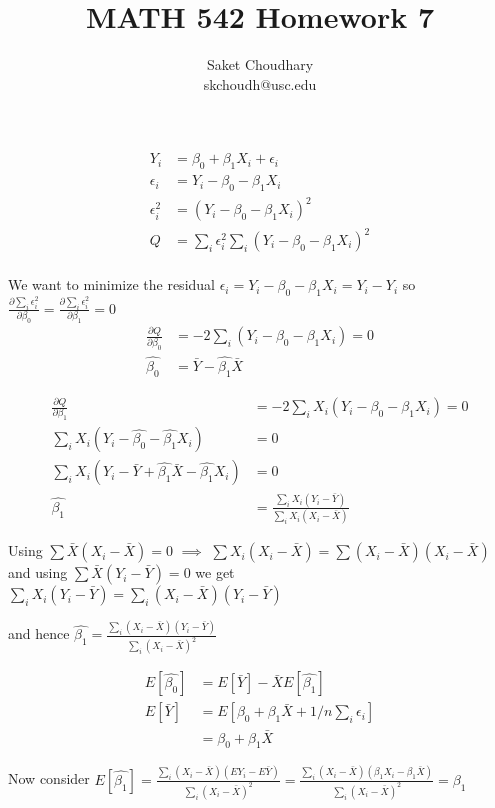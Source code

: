 \documentclass[a4paper]{article}
\title{MATH 542 Homework 7}
\author{Saket Choudhary\\skchoudh@usc.edu}
\begin{document}
\maketitle 

\begin{align*}
Y_i &= \beta_0+\beta_1X_i+\epsilon_i\\
\epsilon_i&=Y_i - \beta_0-\beta_1X_i\\
\epsilon_i^2&=(Y_i - \beta_0-\beta_1X_i)^2\\
Q&=\sum_i\epsilon_i^2\sum_i(Y_i - \beta_0-\beta_1X_i)^2\\
\end{align*}

We want to minimize the residual $\epsilon_i=Y_i - \beta_0-\beta_1X_i = Y_i-\hat{Y_i}$ so $\frac{\partial \sum_i\epsilon_i^2}{\partial \beta_0}=\frac{\partial \sum_i\epsilon_i^2}{\partial \beta_1}=0$
\begin{align*}
\frac{\partial Q}{\partial \beta_0} &= -2\sum_i(Y_i - \beta_0-\beta_1X_i)=0\\
\hat{\beta_0} &= \bar{Y}-\hat{\beta_1}\bar{X}
\end{align*}

\begin{align*}
\frac{\partial Q}{\partial \beta_1} &= -2\sum_iX_i(Y_i - \beta_0-\beta_1X_i)=0\\
\sum_iX_i(Y_i - \hat{\beta_0}-\hat{\beta_1}X_i)&=0\\
\sum_iX_i(Y_i - \bar{Y}+\hat{\beta_1}\bar{X}-\hat{\beta_1}X_i)&=0\\
\hat{\beta_1} &= \frac{\sum_iX_i(Y_i-\bar{Y})}{\sum_iX_i(X_i-\bar{X})}
\end{align*}

Using $\sum \bar{X}(X_i-\bar{X}) =0$ $\implies$ $\sum X_i(X_i-\bar{X})=\sum (X_i-\bar{X})(X_i-\bar{X})$
and using $\sum \bar{X}(Y_i-\bar{Y}) =0$ we get $\sum_iX_i(Y_i-\bar{Y}) = \sum_i(X_i-\bar{X})(Y_i-\bar{Y})$

and hence $\hat{\beta_1} = \frac{\sum_i(X_i-\bar{X})(Y_i-\bar{Y})}{\sum_i(X_i-\bar{X})^2}$

\begin{align*}
E[\hat{\beta_0}] &= E[\bar{Y}]-\bar{X}E[\hat{\beta_1}]\\
E[\bar{Y}] &= E[\beta_0+\beta_1\bar{X}+1/n\sum_i \epsilon_i] \\
&=\beta_0+\beta_1\bar{X}
\end{align*}

Now consider $E[\hat{\beta_1}] = \frac{\sum_i(X_i-\bar{X})(EY_i-E\bar{Y})}{\sum_i(X_i-\bar{X})^2} = \frac{\sum_i(X_i-\bar{X})(\beta_1 X_i-\beta_1 \bar{X})}{\sum_i(X_i-\bar{X})^2} = \beta_1$
\end{document}
